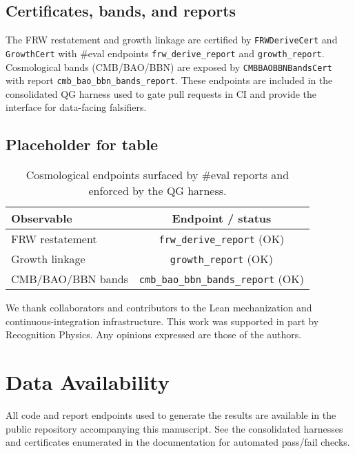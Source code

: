\documentclass[aps,prd,twocolumn,superscriptaddress,nofootinbib,floatfix,longbibliography]{revtex4-2}
\newcommand{\lean}[1]{\texttt{#1}}
\begin{document}
\subsection{Certificates, bands, and reports}
The FRW restatement and growth linkage are certified by \lean{FRWDeriveCert} and \lean{GrowthCert} with \#eval endpoints \lean{frw_derive_report} and \lean{growth_report}. Cosmological bands (CMB/BAO/BBN) are exposed by \lean{CMBBAOBBNBandsCert} with report \lean{cmb_bao_bbn_bands_report}. These endpoints are included in the consolidated QG harness used to gate pull requests in CI and provide the interface for data-facing falsifiers.

\subsection{Placeholder for table}
\begin{table}[t]
  \centering
  \begin{tabular}{l c}
    \toprule
    Observable & Endpoint / status \\
    \midrule
    FRW restatement & \texttt{frw\_derive\_report} (OK) \\
    Growth linkage & \texttt{growth\_report} (OK) \\
    CMB/BAO/BBN bands & \texttt{cmb\_bao\_bbn\_bands\_report} (OK) \\
    \bottomrule
  \end{tabular}
  \caption{Cosmological endpoints surfaced by \#eval reports and enforced by the QG harness.}
  \label{tab:frw-endpoints}
\end{table}

% 
% 
% 
% 
% 
% 
% 
% 
% 
% 
% 
% 

\begin{acknowledgments}
We thank collaborators and contributors to the Lean mechanization and continuous-integration infrastructure. This work was supported in part by Recognition Physics. Any opinions expressed are those of the authors.
\end{acknowledgments}

\section*{Data Availability}
All code and report endpoints used to generate the results are available in the public repository accompanying this manuscript. See the consolidated harnesses and certificates enumerated in the documentation for automated pass/fail checks.
\end{document}
